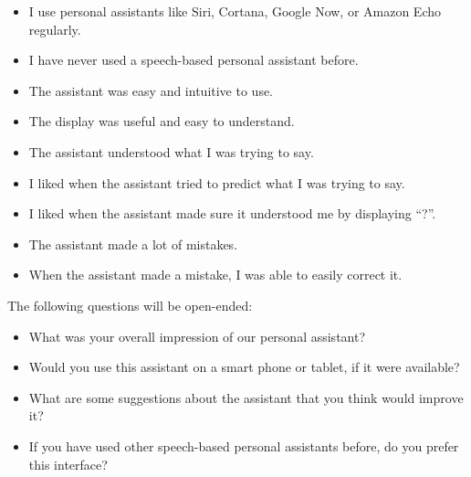 \documentclass[a4paper,10pt]{article}
\begin{document}
\begin{itemize}
 \item I use personal assistants like Siri, Cortana, Google Now, or Amazon Echo regularly.
 \item I have never used a speech-based personal assistant before. 
 \item The assistant was easy and intuitive to use.
 \item The display was useful and easy to understand.
 \item The assistant understood what I was trying to say.
 \item I liked when the assistant tried to predict what I was trying to say.
 \item I liked when the assistant made sure it understood me by displaying ``?''.
 \item The assistant made a lot of mistakes.
 \item When the assistant made a mistake, I was able to easily correct it.
\end{itemize}


The following questions will be open-ended:

\begin{itemize}
 \item What was your overall impression of our personal assistant?
 \item Would you use this assistant on a smart phone or tablet, if it were available?
 \item What are some suggestions about the assistant that you think would improve it?
 \item If you have used other speech-based personal assistants before, do you prefer this interface?
\end{itemize}



% 
% 
% 
% 





% 
% 
\end{document}
